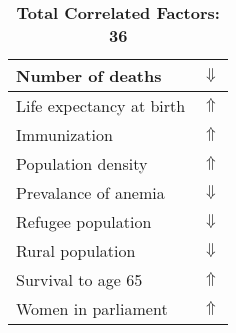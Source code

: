 \documentclass[12pt,notitlepage,oneside]{report}
\begin{document}
\begin{table}[!htb]
\begin{tabular}{|l|l|}
Number of deaths & $\Downarrow$\\ \hline
Life expectancy at birth & $\Uparrow$\\ \hline
Immunization & $\Uparrow$\\ \hline
Population density & $\Uparrow$\\ \hline
Prevalance of anemia & $\Downarrow$\\ \hline
Refugee population & $\Downarrow$\\ \hline
Rural population & $\Downarrow$\\ \hline
Survival to age 65 & $\Uparrow$\\ \hline
Women in parliament & $\Uparrow$\\ \hline
\end{tabular}
\caption*{\textbf{Total Correlated Factors: 36}}
\end{table}
\clearpage
\end{document}

